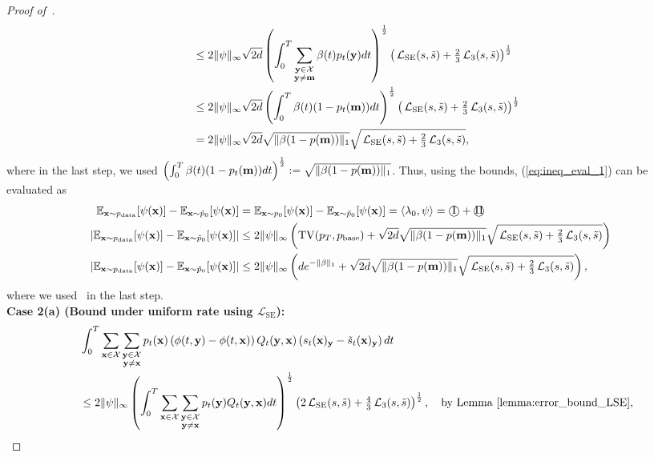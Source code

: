 \documentclass{article} %
\def\eqref#1{equation~\ref{#1}}
\newcommand{\bfx}{{\bf x}}
\newcommand{\bfy}{ {\bf y}}
\newcommand{\bfm}{{\bf m}}
\newcommand{\TV}{\mathrm{TV}}
\newcommand{\cI}{\text{\textcircled{I}}}
\newcommand{\cII}{\text{\textcircled{II}}}
\newcommand{\LSE}{\mathcal{L}_{\mathrm{SE}}}
\renewcommand{\eqref}[1]{\textup{(\ref{#1})}}
\newcommand{\LThree}{\mathcal{L}_{3}}
\begin{document}
\begin{proof}[Proof of~]
\begin{align*}
    \quad &\leq 2 \| \psi \|_\infty \sqrt{2 d} \left( \int_0^T \sum_{\substack{\bfy \in \mathcal{X} \\ \bfy \neq \bfm}}  \beta(t) p_t(\bfy) dt \right)^{\frac{1}{2}} \left( \,\LSE(s, \tilde{s}) + \tfrac{2}{3}\,\LThree(s, \tilde{s}) \right)^{\frac{1}{2}} \\
    \quad &\leq 2 \| \psi \|_\infty  \sqrt{2d} \left( \int_0^T \beta(t) (1-p_t(\bfm)) dt \right)^{\frac{1}{2}} \left( \,\LSE(s, \tilde{s}) + \tfrac{2}{3}\,\LThree(s, \tilde{s}) \right)^{\frac{1}{2}} \\
    \quad &= 2 \| \psi \|_\infty \sqrt{2 d} \sqrt{\| \beta (1-p(\bfm))\|_1} \sqrt{ \,\LSE(s, \tilde{s}) + \tfrac{2}{3}\,\LThree(s, \tilde{s}) },
\end{align*}
where in the last step, we used $\left( \int_0^T \beta(t) (1-p_t(\bfm)) dt \right)^{\frac{1}{2}} := \sqrt{\| \beta (1-p(\bfm))\|_1} $.
Thus, 
using the bounds, \eqref{eq:ineq_eval_1} can be evaluated as
\begin{align*}
     \mathbb{E}_{\bfx \sim p_{\mathrm{data}}}[\psi(\bfx)] - \mathbb{E}_{\bfx \sim \tilde{p}_0}[\psi(\bfx)]  &=  \mathbb{E}_{\bfx \sim p_{0}}[\psi(\bfx)] - \mathbb{E}_{\bfx \sim \tilde{p}_0}[\psi(\bfx)]  = \langle \lambda_0, \psi \rangle = \cI + \cII  \\
    \left| \mathbb{E}_{\bfx \sim p_{\mathrm{data}}}[\psi(\bfx)] - \mathbb{E}_{\bfx \sim \tilde{p}_0}[\psi(\bfx)] \right| &\leq 2 \|\psi\|_\infty \left( \TV(p_T, p_{\rm base})  +   \sqrt{2 d} \sqrt{\| \beta (1-p(\bfm))\|_1} \sqrt{ \,\LSE(s, \tilde{s}) + \tfrac{2}{3}\,\LThree(s, \tilde{s}) } \right) \\
    \left| \mathbb{E}_{\bfx \sim p_{\mathrm{data}}}[\psi(\bfx)] - \mathbb{E}_{\bfx \sim \tilde{p}_0}[\psi(\bfx)] \right| &\leq 2 \|\psi\|_\infty \left( d e^{-\| \beta \|_1}  +   \sqrt{2 d} \sqrt{\| \beta (1-p(\bfm))\|_1} \sqrt{ \,\LSE(s, \tilde{s}) + \tfrac{2}{3}\,\LThree(s, \tilde{s}) } \right),
\end{align*}
where we used~ in the last step. \\
\textbf{Case 2(a) (Bound under uniform rate using $\LSE$):} 
\begin{align*}
    &\int_0^T \sum_{\substack{\bfx\in\mathcal{X}}} \sum_{\substack{\bfy\in\mathcal{X} \\ \bfy\neq \bfx}}  p_t(\bfx) \left(\phi(t, \bfy)-\phi(t, \bfx) \right) Q_t(\bfy, \bfx) \left( s_t(\bfx)_\bfy - \tilde{s}_t(\bfx)_\bfy \right)  dt \\
    \quad & \leq 2 \| \psi \|_\infty \left(\int_0^T \sum_{\substack{\bfx\in\mathcal{X}}} \sum_{\substack{\bfy\in\mathcal{X} \\\bfy\neq \bfx}} p_t(\bfy)  Q_t(\bfy, \bfx)  dt\right)^{\frac{1}{2}} \left( 2\,\LSE(s, \tilde{s}) + \tfrac{4}{3}\,\LThree(s, \tilde{s}) \right)^{\frac{1}{2}}, \quad \text{by Lemma~\ref{lemma:error_bound_LSE}}, \\

\end{align*}
\end{proof}
\end{document}
